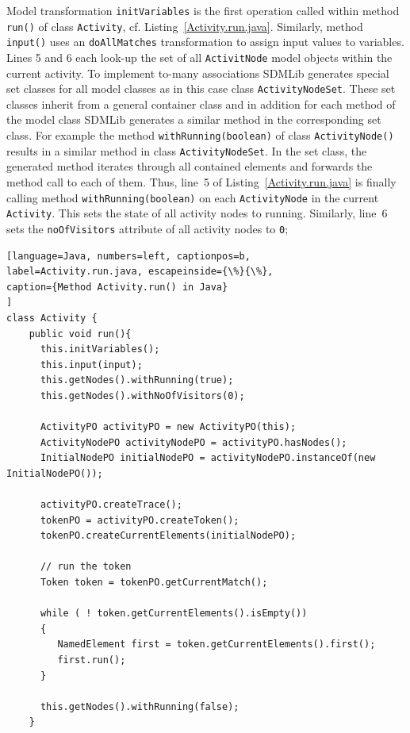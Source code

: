 \documentclass[submission,copyright,creativecommons]{eptcs}
\begin{document}
Model transformation \texttt{initVariables} is the first operation called within 
method \texttt{run()} of class \texttt{Activity}, cf. Listing~\ref{Activity.run.java}. 
Similarly, method \texttt{input()} uses an \texttt{doAllMatches} transformation to 
assign input values to variables. Lines 5 and 6 each look-up the set of all 
\texttt{ActivitNode} model objects within the current activity. To implement to-many associations SDMLib generates special set classes for all model classes 
as in this case class \texttt{ActivityNodeSet}. These set classes inherit from a general 
container class and in addition for each method of the model class SDMLib generates a similar method in the corresponding set class. For example the method 
\texttt{withRunning(boolean)} of class \texttt{ActivityNode()} results in a similar method in class \texttt{ActivityNodeSet}. In the set class, the generated method iterates through all contained elements and forwards the method call to each of them. 
Thus, line~5 of Listing~\ref{Activity.run.java} is finally calling method 
\texttt{withRunning(boolean)} on each \texttt{ActivityNode} in the current 
\texttt{Activity}. This sets the state of all activity nodes to running. Similarly, 
line~6 sets the \texttt{noOfVisitors} attribute of all activity nodes to \texttt{0};

\begin{lstlisting}[language=Java, numbers=left, captionpos=b, 
label=Activity.run.java, escapeinside={\%}{\%},
caption={Method Activity.run() in Java}
]
class Activity {
    public void run(){
      this.initVariables();
      this.input(input);
      this.getNodes().withRunning(true);
      this.getNodes().withNoOfVisitors(0);
      
      ActivityPO activityPO = new ActivityPO(this);
      ActivityNodePO activityNodePO = activityPO.hasNodes();
      InitialNodePO initialNodePO = activityNodePO.instanceOf(new InitialNodePO());

      activityPO.createTrace();
      tokenPO = activityPO.createToken();
      tokenPO.createCurrentElements(initialNodePO);
         
      // run the token
      Token token = tokenPO.getCurrentMatch();
      
      while ( ! token.getCurrentElements().isEmpty())
      {
         NamedElement first = token.getCurrentElements().first();
         first.run();
      }
      
      this.getNodes().withRunning(false);
    }
\end{lstlisting}
\end{document}
